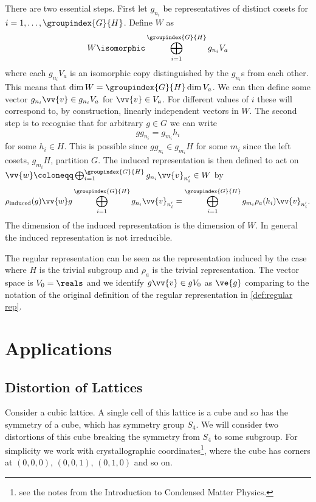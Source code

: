 There are two essential steps.
First let \(g_{n_i}\) be representatives of distinct cosets for \(i = 1,
\dotsc, \groupindex{G}{H}\).
Define \(W\) as
\begin{equation}
    W \isomorphic \bigoplus_{i = 1}^{\groupindex{G}{H}} g_{n_i} V_a
\end{equation}
where each \(g_{n_i}V_a\) is an isomorphic copy distinguished by the
\(g_{n_i}\)s from each other.
This means that \(\dim W = \groupindex{G}{H}\dim V_a\).
We can then define some vector \(g_{n_i}\vv{v} \in g_{n_i}V_a\) for \(\vv{v}
\in V_a\).
For different values of \(i\) these will correspond to, by construction,
linearly independent vectors in \(W\).
The second step is to recognise that for arbitrary \(g \in G\) we can write
\begin{equation}
    g g_{n_i} = g_{m_i} h_i
\end{equation}
for some \(h_i \in H\).
This is possible since \(gg_{n_i} \in g_{m_i}H\) for some \(m_i\) since the
left cosets, \(g_{m_i}H\), partition \(G\).
The induced representation is then defined to act on \(\vv{w} \coloneqq
\bigoplus_{i = 1}^{\groupindex{G}{H}} g_{n_i}\vv{v}_{n'_i} \in W\) by
\begin{equation}
    \rho_{\mathrm{induced}}(g) \vv{w} g \bigoplus_{i =
        1}^{\groupindex{G}{H}} g_{n_i}\vv{v}_{n'_i} = \bigoplus_{i =
        1}^{\groupindex{G}{H}} g_{m_i} \rho_a(h_i) \vv{v}_{n'_i}.
\end{equation}
The dimension of the induced representation is the dimension of \(W\).
In general the induced representation is not irreducible.

The regular representation can be seen as the representation induced by the
case where \(H\) is the trivial subgroup and \(\rho_a\) is the trivial
representation.
The vector space is \(V_0 = \reals\) and we identify \(g\vv{v} \in gV_0\) as
\(\ve{g}\) comparing to the notation of the original definition of the regular
representation in \cref{def:regular rep}.

\section{Applications}
\subsection{Distortion of Lattices}
Consider a cubic lattice.
A single cell of this lattice is a cube and so has the symmetry of a cube,
which has symmetry group \(S_4\).
We will consider two distortions of this cube breaking the symmetry from
\(S_4\) to some subgroup.
For simplicity we work with crystallographic coordinates\footnote{see the
    notes from the Introduction to Condensed Matter Physics.}, where the cube has
corners at \((0, 0, 0)\), \((0, 0, 1)\), \((0, 1, 0)\) and so on.

